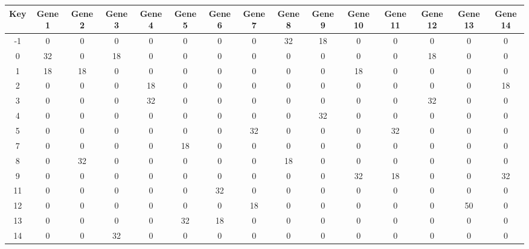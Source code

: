 \begin{tabular}{|c|c|c|c|c|c|c|c|c|c|c|c|c|c|c|}
\hline
Key & Gene 1 & Gene 2 & Gene 3 & Gene 4 & Gene 5 & Gene 6 & Gene 7 & Gene 8 & Gene 9 & Gene 10 & Gene 11 & Gene 12 & Gene 13 & Gene 14 \\
\hline
-1 & 0 & 0 & 0 & 0 & 0 & 0 & 0 & 32 & 18 & 0 & 0 & 0 & 0 & 0 \\
0 & 32 & 0 & 18 & 0 & 0 & 0 & 0 & 0 & 0 & 0 & 0 & 18 & 0 & 0 \\
1 & 18 & 18 & 0 & 0 & 0 & 0 & 0 & 0 & 0 & 18 & 0 & 0 & 0 & 0 \\
2 & 0 & 0 & 0 & 18 & 0 & 0 & 0 & 0 & 0 & 0 & 0 & 0 & 0 & 18 \\
3 & 0 & 0 & 0 & 32 & 0 & 0 & 0 & 0 & 0 & 0 & 0 & 32 & 0 & 0 \\
4 & 0 & 0 & 0 & 0 & 0 & 0 & 0 & 0 & 32 & 0 & 0 & 0 & 0 & 0 \\
5 & 0 & 0 & 0 & 0 & 0 & 0 & 32 & 0 & 0 & 0 & 32 & 0 & 0 & 0 \\
7 & 0 & 0 & 0 & 0 & 18 & 0 & 0 & 0 & 0 & 0 & 0 & 0 & 0 & 0 \\
8 & 0 & 32 & 0 & 0 & 0 & 0 & 0 & 18 & 0 & 0 & 0 & 0 & 0 & 0 \\
9 & 0 & 0 & 0 & 0 & 0 & 0 & 0 & 0 & 0 & 32 & 18 & 0 & 0 & 32 \\
11 & 0 & 0 & 0 & 0 & 0 & 32 & 0 & 0 & 0 & 0 & 0 & 0 & 0 & 0 \\
12 & 0 & 0 & 0 & 0 & 0 & 0 & 18 & 0 & 0 & 0 & 0 & 0 & 50 & 0 \\
13 & 0 & 0 & 0 & 0 & 32 & 18 & 0 & 0 & 0 & 0 & 0 & 0 & 0 & 0 \\
14 & 0 & 0 & 32 & 0 & 0 & 0 & 0 & 0 & 0 & 0 & 0 & 0 & 0 & 0 \\
\hline
\end{tabular}